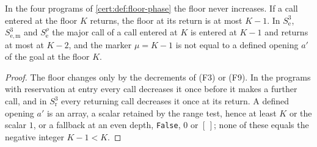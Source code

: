\begin{lemma}\label{cert:lem:floor-phase}
In the four programs of \cref{cert:def:floor-phase} the floor never increases. If a
call entered at the floor $K$ returns, the floor at its return is at most $K-1$. In
$S^{3}_{\mathrm e}$, $S^{3}_{\mathrm{e,m}}$ and $S^{\rho}_{\mathrm e}$ the major call
of a call entered at $K$ is entered at $K-1$ and returns at most at $K-2$, and the
marker $\mu=K-1$ is not equal to a defined opening $a'$ of the goal at the floor $K$.
\end{lemma}
\begin{proof}
The floor changes only by the decrements of (F3) or (F9). In the programs with
reservation at entry every call decreases it once before it makes a further call, and
in $S^{3}_{\mathrm r}$ every returning call decreases it once at its return. A defined
opening $a'$ is an array, a scalar retained by the range test, hence at least $K$ or
the scalar $1$, or a fallback at an even depth, \texttt{False}, $0$ or $[\,]$; none of
these equals the negative integer $K-1<K$.
\end{proof}

